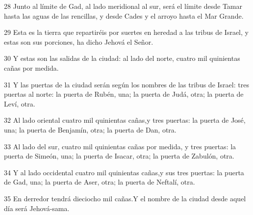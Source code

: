 \par 28 Junto al límite de Gad, al lado meridional al sur, será el límite desde Tamar hasta las aguas de las rencillas, y desde Cades y el arroyo hasta el Mar Grande.
\par 29 Esta es la tierra que repartiréis por suertes en heredad a las tribus de Israel, y estas son sus porciones, ha dicho Jehová el Señor.
\par 30 Y estas son las salidas de la ciudad: al lado del norte, cuatro mil quinientas cañas por medida.
\par 31 Y las puertas de la ciudad serán según los nombres de las tribus de Israel: tres puertas al norte: la puerta de Rubén, una; la puerta de Judá, otra; la puerta de Leví, otra.
\par 32 Al lado oriental cuatro mil quinientas cañas,y tres puertas: la puerta de José, una; la puerta de Benjamín, otra; la puerta de Dan, otra.
\par 33 Al lado del sur, cuatro mil quinientas cañas por medida, y tres puertas: la puerta de Simeón, una; la puerta de Isacar, otra; la puerta de Zabulón, otra.
\par 34 Y al lado occidental cuatro mil quinientas cañas,y sus tres puertas: la puerta de Gad, una; la puerta de Aser, otra; la puerta de Neftalí, otra.
\par 35 En derredor tendrá dieciocho mil cañas.Y el nombre de la ciudad desde aquel día será Jehová-sama.


